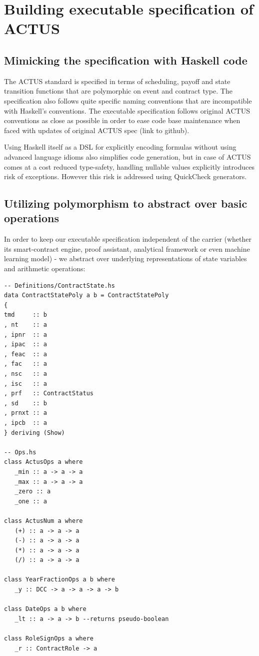 \documentclass[runningheads]{llncs}
\begin{document}
\section{Building executable specification of ACTUS}

\subsection{Mimicking the specification with Haskell code}

The ACTUS standard is specified in terms of scheduling, payoff and
state transition functions that are polymorphic on event and contract
type. The specification also follows quite specific naming conventions
that are incompatible with Haskell's conventions. The executable specification
follows original ACTUS conventions as close as possible in order to
ease code base maintenance when faced with updates of original ACTUS
spec (link to github).

Using Haskell itself as a DSL for explicitly encoding formulas without
using advanced language idioms also simplifies code generation, but
in case of ACTUS comes at a cost reduced type-safety, handling nullable
values explicitly introduces risk of exceptions. However this risk
is addressed using QuickCheck generators.

\subsection{Utilizing polymorphism to abstract over basic operations}

In order to keep our executable specification independent of the carrier
(whether its smart-contract engine, proof assistant, analytical framework
or even machine learning model) - we abstract over underlying representations
of state variables and arithmetic operations:

\begin{verbatim}
-- Definitions/ContractState.hs 
data ContractStatePoly a b = ContractStatePoly  
{  
tmd     :: b  
, nt    :: a  
, ipnr  :: a  
, ipac  :: a  
, feac  :: a  
, fac   :: a  
, nsc   :: a  
, isc   :: a  
, prf   :: ContractStatus  
, sd    :: b  
, prnxt :: a  
, ipcb  :: a  
} deriving (Show) 

-- Ops.hs
class ActusOps a where    
   _min :: a -> a -> a
   _max :: a -> a -> a
   _zero :: a
   _one :: a

class ActusNum a where
   (+) :: a -> a -> a
   (-) :: a -> a -> a
   (*) :: a -> a -> a
   (/) :: a -> a -> a

class YearFractionOps a b where
   _y :: DCC -> a -> a -> a -> b   

class DateOps a b where
   _lt :: a -> a -> b --returns pseudo-boolean   

class RoleSignOps a where
   _r :: ContractRole -> a
\end{verbatim}
\end{document}
